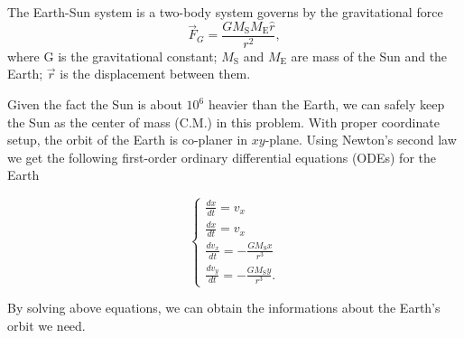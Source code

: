 The Earth-Sun system is a two-body system governs by the gravitational force
\begin{equation}
	\vec{F}_G = \frac{GM_{\mathrm{S}}M_{\mathrm{E}}\hat{r}}{r^2},
\end{equation}
where G is the gravitational constant; 
$M_{\mathrm{S}}$ and $M_{\mathrm{E}}$ are mass of the Sun and the Earth; $\vec{r}$ is the displacement between them.

Given the fact the Sun is about $10^6$ heavier than the Earth, we can safely keep the Sun as the center of mass (C.M.) in this problem. 
With proper coordinate setup, the orbit of the Earth is co-planer in $xy$-plane. 
Using Newton's second law we get the following first-order ordinary differential equations (ODEs) for the Earth

\begin{equation}
	\label{earthsunodes}
	\left\{  
             \begin{array}{lr}  
             	\frac{dx}{dt} = v_x \\
				\frac{dx}{dt} = v_x \\
            	\frac{dv_x}{dt} = -\frac{GM_{\mathrm{S}}x}{r^3} \\
				\frac{dv_y}{dt} = -\frac{GM_{\mathrm{S}}y}{r^3}.
			\end{array}  
	\right.	
\end{equation}

By solving above equations, we can obtain the informations about the Earth's orbit we need.
